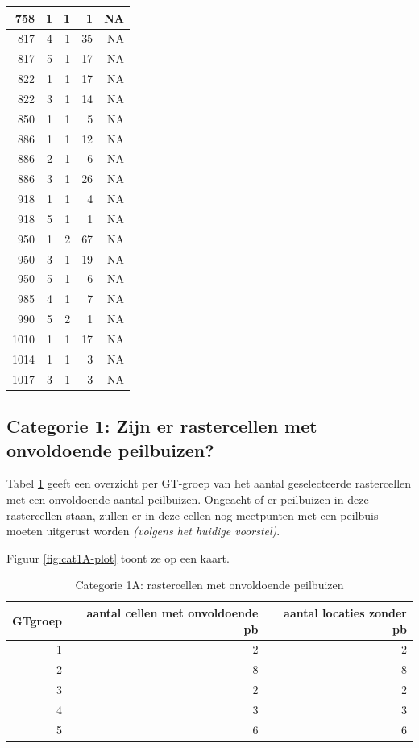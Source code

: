 \documentclass[11pt,]{book}
\begin{document}
\begin{table}
\begin{tabular}[t]{r|r|r|r|r}
758 & 1 & 1 & 1 & NA\\
\hline
817 & 4 & 1 & 35 & NA\\
\hline
817 & 5 & 1 & 17 & NA\\
\hline
822 & 1 & 1 & 17 & NA\\
\hline
822 & 3 & 1 & 14 & NA\\
\hline
850 & 1 & 1 & 5 & NA\\
\hline
886 & 1 & 1 & 12 & NA\\
\hline
886 & 2 & 1 & 6 & NA\\
\hline
886 & 3 & 1 & 26 & NA\\
\hline
918 & 1 & 1 & 4 & NA\\
\hline
918 & 5 & 1 & 1 & NA\\
\hline
950 & 1 & 2 & 67 & NA\\
\hline
950 & 3 & 1 & 19 & NA\\
\hline
950 & 5 & 1 & 6 & NA\\
\hline
985 & 4 & 1 & 7 & NA\\
\hline
990 & 5 & 2 & 1 & NA\\
\hline
1010 & 1 & 1 & 17 & NA\\
\hline
1014 & 1 & 1 & 3 & NA\\
\hline
1017 & 3 & 1 & 3 & NA\\
\hline
\end{tabular}
\end{table}

\subsection{Categorie 1: Zijn er rastercellen met onvoldoende
peilbuizen?}\label{categorie-1-zijn-er-rastercellen-met-onvoldoende-peilbuizen}

Tabel \ref{tab:cat1A-table} geeft een overzicht per GT-groep van het
aantal geselecteerde rastercellen met een onvoldoende aantal peilbuizen.
Ongeacht of er peilbuizen in deze rastercellen staan, zullen er in deze
cellen nog meetpunten met een peilbuis moeten uitgerust worden
\emph{(volgens het huidige voorstel)}.

Figuur \ref{fig:cat1A-plot} toont ze op een kaart.

\begin{table}

\caption{\label{tab:cat1A-table}Categorie 1A: rastercellen met onvoldoende peilbuizen}
\centering
\begin{tabular}[t]{r|r|r}
\hline
GTgroep & aantal cellen met onvoldoende pb & aantal locaties zonder pb\\
\hline
1 & 2 & 2\\
\hline
2 & 8 & 8\\
\hline
3 & 2 & 2\\
\hline
4 & 3 & 3\\
\hline
5 & 6 & 6\\
\hline
\end{tabular}
\end{table}
\end{document}
